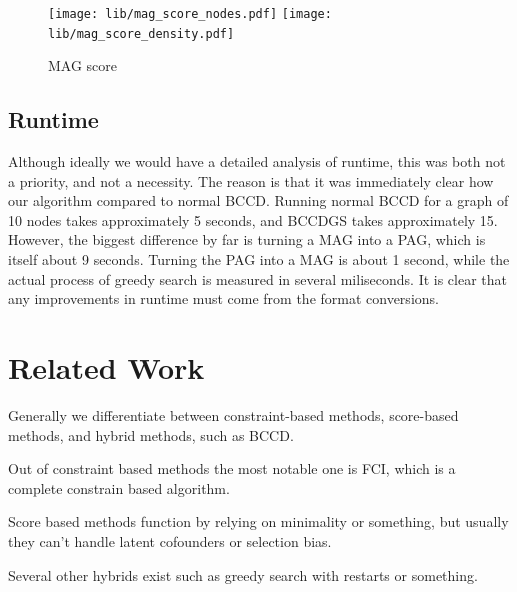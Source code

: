 \documentclass[11pt,a4paper]{report}
\theoremstyle{definition}
\begin{document}
\begin{figure}
  \centering
  \texttt{[image: lib/mag\_score\_nodes.pdf]}
  \texttt{[image: lib/mag\_score\_density.pdf]}
  \caption{MAG score}
  \label{fig:mag_score}
\end{figure}

\section{Runtime}\label{runtime}
Although ideally we would have a detailed analysis of runtime, this was
both not a priority, and not a necessity. The reason is that it was
immediately clear how our algorithm compared to normal BCCD. Running
normal BCCD for a graph of 10 nodes takes approximately 5 seconds, and
BCCDGS takes approximately 15. However, the biggest difference by far is
turning a MAG into a PAG, which is itself about 9 seconds. Turning the PAG
into a MAG is about 1 second, while the actual process of greedy search is
measured in several miliseconds. It is clear that any improvements in
runtime must come from the format conversions.

\chapter{Related Work}\label{relatedwork}
Generally we differentiate between constraint-based methods, score-based
methods, and hybrid methods, such as BCCD.

Out of constraint based methods the most notable one is
FCI\cite{spirtesCausationPredictionSearch2000}, which is a complete
\cite{zhangCompletenessOrientationRules2008} constrain based algorithm.

Score based methods function by relying on minimality or something, but
usually they can't handle latent cofounders or selection bias.

Several other hybrids exist such as greedy search with restarts or
something.


\end{document}
